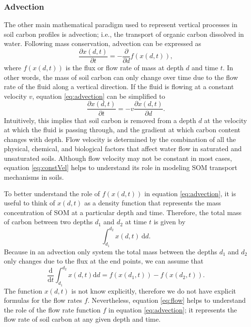 \documentclass[11pt, oneside, a4paper]{article}   	%
\begin{document}
\subsubsection{Advection}
The other main mathematical paradigm used to represent vertical processes in soil carbon profiles is advection; i.e., the transport of organic carbon dissolved in water. 
Following mass conservation, advection can be expressed as
\begin{equation} \label{eq:advection}
\frac{\partial x(d, t)}{\partial t} = - \frac{\partial }{\partial d} f(x(d, t)),
\end{equation}
where $f(x(d, t))$ is the flux or flow rate of mass at depth $d$ and time $t$. In other words, the mass of soil carbon can only change over time due to the flow rate of the fluid along a vertical direction. If the fluid is flowing at a constant velocity $v$, equation \ref{eq:advection} can be simplified to
\begin{equation} \label{eq:constVel}
\frac{\partial x(d, t)}{\partial t} = -v \frac{\partial x(d, t)}{\partial d}.
\end{equation}
Intuitively, this implies that soil carbon is removed from a depth $d$ at the velocity at which the fluid is passing through, and the gradient at which carbon content changes with depth. Flow velocity is determined by the combination of all the physical, chemical, and biological factors that affect water flow in saturated and unsaturated soils. Although flow velocity may not be constant in most cases, equation \ref{eq:constVel} helps to understand its role in modeling SOM transport mechanisms in soils.  

To better understand the role of $f(x(d, t))$ in equation \ref{eq:advection}, it is useful to think of $x(d, t)$ as a density function \citep{LeVeque1990} that represents the mass concentration of SOM at a particular depth and time. Therefore, the total mass of carbon between two depths $d_1$ and $d_2$ at time $t$ is given by
$$
\int_{d_1}^{d_2} x(d, t) \ \mathrm{d}d.
$$
Because in an advection only system the total mass between the depths $d_1$ and $d_2$ only changes due to the flux at the end points, we can assume that
\begin{equation} \label{eq:flow}
\frac{\mathrm{d}}{\mathrm{d}t} \int_{d_1}^{d_2} x(d, t) \mathrm{d}d = f(x(d_1, t)) -f(x(d_2, t)).
\end{equation}
The function $x(d, t)$ is not know explicitly, therefore we do not have explicit formulas for the flow rates $f$. Nevertheless, equation \ref{eq:flow} helps to understand the role of the flow rate function $f$ in equation \ref{eq:advection}; it represents the flow rate of soil carbon at any given depth and time. 
\end{document}
